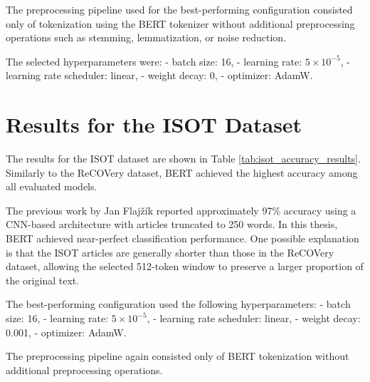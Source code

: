 \FloatBarrier

\begin{markdown}

The preprocessing pipeline used for the best-performing configuration consisted only of tokenization using the BERT tokenizer without additional preprocessing operations such as stemming, lemmatization, or noise reduction.

The selected hyperparameters were:
- batch size: 16,
- learning rate: $5 \times 10^{-5}$,
- learning rate scheduler: linear,
- weight decay: 0,
- optimizer: AdamW.

\end{markdown}

\FloatBarrier

\section{Results for the ISOT Dataset}

\begin{markdown}

The results for the ISOT dataset are shown in Table \ref{tab:isot_accuracy_results}. Similarly to the ReCOVery dataset, BERT achieved the highest accuracy among all evaluated models.

The previous work by Jan Flajžík \cite{flajzik_classification_2024} reported approximately 97\% accuracy using a CNN-based architecture with articles truncated to 250 words. In this thesis, BERT achieved  near-perfect classification performance. One possible explanation is that the ISOT articles are generally shorter than those in the ReCOVery dataset, allowing the selected 512-token window to preserve a larger proportion of the original text.

\end{markdown}

\begin{table}[b]
    \small
    \centering
    \caption{Best results for the ISOT dataset ranked by accuracy}
    \label{tab:isot_accuracy_results}
    
\end{table}

\FloatBarrier

\begin{markdown}

The best-performing configuration used the following hyperparameters:
- batch size: 16,
- learning rate: $5 \times 10^{-5}$,
- learning rate scheduler: linear,
- weight decay: 0.001,
- optimizer: AdamW.

The preprocessing pipeline again consisted only of BERT tokenization without additional preprocessing operations.

\end{markdown}

